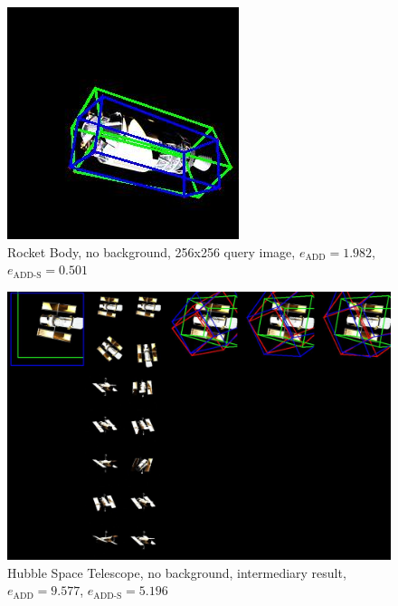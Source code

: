 \begin{figure}[h]
\begin{minipage}{0.45\linewidth}
        \includegraphics[width=\linewidth]{data/fig10.jpg} %
        \caption{Rocket Body, no background, 256x256 query image, $e_\mathrm{ADD}=1.982$, $e_{\mathrm{ADD}\text{-}\mathrm{S}}=0.501$ }
        \label{fig:fig10}
    \end{minipage}
\end{figure}

\begin{figure}[ht]
  \centering
  \includegraphics[width=\textwidth]{data/fig11.jpg}
  \caption{Hubble Space Telescope, no background, intermediary result, $e_\mathrm{ADD}=9.577$, $e_{\mathrm{ADD}\text{-}\mathrm{S}}=5.196$}
  \label{fig:fig11}
\end{figure}

